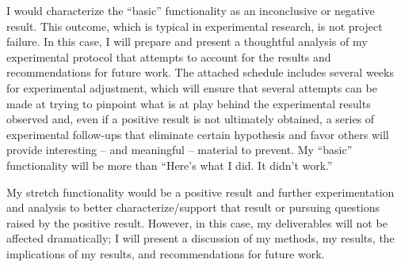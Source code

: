 I would characterize the ``basic'' functionality as an inconclusive or negative result. This outcome, which is typical in experimental research, is not project failure. In this case, I will prepare and present a thoughtful analysis of my experimental protocol that attempts to account for the results and recommendations for future work. The attached schedule includes several weeks for experimental adjustment, which will ensure that several attempts can be made at trying to pinpoint what is at play behind the experimental results observed and, even if a positive result is not ultimately obtained, a series of experimental follow-ups that eliminate certain hypothesis and favor others will provide interesting -- and meaningful -- material to prevent. My ``basic'' functionality will be more than ``Here's what I did. It didn't work.''

My stretch functionality would be a positive result and further experimentation and analysis to better characterize/support that result or pursuing questions raised by the positive result. However, in this case, my deliverables will not be affected dramatically; I will present a discussion of my methods, my results, the implications of my results, and recommendations for future work. 
